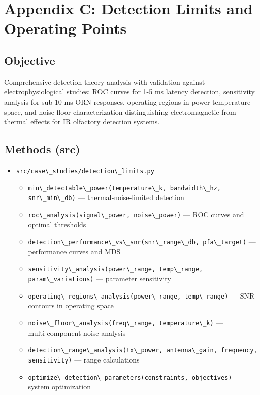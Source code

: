 \documentclass[
  13pt,
  a4paperpaper,
  12pt]{article}
\author{}
\date{}
\newcommand{\passthrough}[1]{#1}
\providecommand{\tightlist}{%
  \setlength{\itemsep}{0pt}\setlength{\parskip}{0pt}}
\let\oldsection\section
\renewcommand{\section}{\clearpage\oldsection}
\begin{document}
{
\hypersetup{linkcolor=black}
\setcounter{tocdepth}{3}
\tableofcontents
}
\section{Appendix C: Detection Limits and Operating
Points}\label{sec:app_detection_limits}

\subsection{Objective}\label{objective}

Comprehensive detection‑theory analysis with validation against
electrophysiological studies: ROC curves for 1-5 ms latency detection,
sensitivity analysis for sub-10 ms ORN responses, operating regions in
power-temperature space, and noise‑floor characterization distinguishing
electromagnetic from thermal effects for IR olfactory detection systems.

\subsection{Methods (src)}\label{methods-src}

\begin{itemize}
\tightlist
\item
  \passthrough{\lstinline!src/case\_studies/detection\_limits.py!}

  \begin{itemize}
  \tightlist
  \item
    \passthrough{\lstinline!min\_detectable\_power(temperature\_k, bandwidth\_hz, snr\_min\_db)!}
    --- thermal‑noise‑limited detection
  \item
    \passthrough{\lstinline!roc\_analysis(signal\_power, noise\_power)!}
    --- ROC curves and optimal thresholds
  \item
    \passthrough{\lstinline!detection\_performance\_vs\_snr(snr\_range\_db, pfa\_target)!}
    --- performance curves and MDS
  \item
    \passthrough{\lstinline!sensitivity\_analysis(power\_range, temp\_range, param\_variations)!}
    --- parameter sensitivity
  \item
    \passthrough{\lstinline!operating\_regions\_analysis(power\_range, temp\_range)!}
    --- SNR contours in operating space
  \item
    \passthrough{\lstinline!noise\_floor\_analysis(freq\_range, temperature\_k)!}
    --- multi‑component noise analysis
  \item
    \passthrough{\lstinline!detection\_range\_analysis(tx\_power, antenna\_gain, frequency, sensitivity)!}
    --- range calculations
  \item
    \passthrough{\lstinline!optimize\_detection\_parameters(constraints, objectives)!}
    --- system optimization
  \end{itemize}
\end{itemize}
\end{document}
